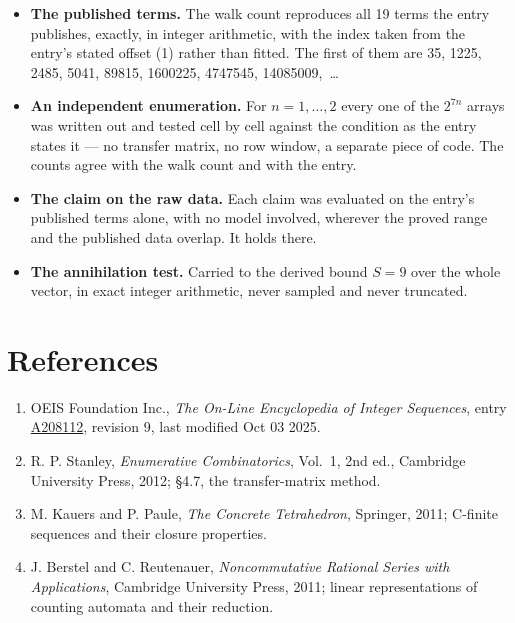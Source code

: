 \documentclass[11pt]{article}
\theoremstyle{definition}
\begin{document}
\begin{itemize}

\item {\bfseries The published terms.} The walk count reproduces all 19 terms the entry publishes, exactly, in integer arithmetic, with the index taken from the entry's stated offset (1) rather than fitted. The first of them are 35, 1225, 2485, 5041, 89815, 1600225, 4747545, 14085009,~\dots

\item {\bfseries An independent enumeration.} For $n = 1,\dots,2$ every one of the $2^{7n}$ arrays was written out and tested cell by cell against the condition as the entry states it --- no transfer matrix, no row window, a separate piece of code. The counts agree with the walk count and with the entry.

\item {\bfseries The claim on the raw data.} Each claim was evaluated on the entry's published terms alone, with no model involved, wherever the proved range and the published data overlap. It holds there.

\item {\bfseries The annihilation test.} Carried to the derived bound $S = 9$ over the whole vector, in exact integer arithmetic, never sampled and never truncated.

\end{itemize}

\section{References}

\begin{enumerate}

\item OEIS Foundation Inc., \emph{The On-Line Encyclopedia of Integer Sequences}, entry \href{https://oeis.org/A208112}{A208112}, revision 9, last modified Oct 03 2025.

\item R. P. Stanley, \emph{Enumerative Combinatorics}, Vol.~1, 2nd ed., Cambridge University Press, 2012; \S4.7, the transfer-matrix method.

\item M. Kauers and P. Paule, \emph{The Concrete Tetrahedron}, Springer, 2011; C-finite sequences and their closure properties.

\item J. Berstel and C. Reutenauer, \emph{Noncommutative Rational Series with Applications}, Cambridge University Press, 2011; linear representations of counting automata and their reduction.

\end{enumerate}
\end{document}
